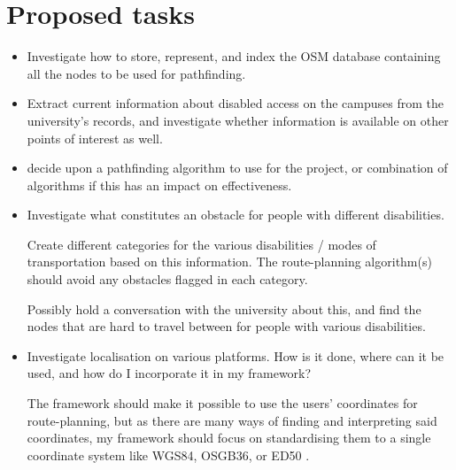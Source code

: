 \documentclass[11pt,fleqn,twoside]{article}
\begin{document}
\section{Proposed tasks}

\begin{itemize}
	
	\item Investigate how to store, represent, and index the OSM database containing all the nodes to be used for pathfinding.
	
	\item Extract current information about disabled access on the campuses from the university's records, and investigate whether information is available on other points of interest as well.
	
	\item decide upon a pathfinding algorithm to use for the project, or combination of algorithms if this has an impact on effectiveness.
	
	\item Investigate what constitutes an obstacle for people with different disabilities.
	
	\subitem Create different categories for the various disabilities / modes of transportation based on this information. The route-planning algorithm(s) should avoid any obstacles flagged in each category.
	
	\subitem Possibly hold a conversation with the university about this, and find the nodes that are hard to travel between for people with various disabilities. %
	
	\item Investigate localisation on various platforms. How is it done, where can it be used, and how do I incorporate it in my framework?
	
	\subitem The framework should make it possible to use the users' coordinates for route-planning, but as there are many ways of finding and interpreting said coordinates, my framework should focus on standardising them to a single coordinate system like WGS84, OSGB36, or ED50 \cite{WGS84,OSGB,OSM_Convert-WGS84}.
	
\end{itemize}
\end{document}
